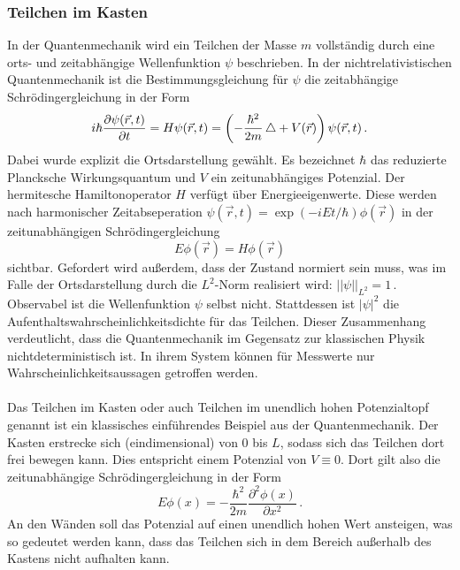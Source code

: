 \subsubsection{Teilchen im Kasten}
\label{subsubsec:kasten}
In der Quantenmechanik wird ein Teilchen der Masse $m$ vollständig durch eine orts- und zeitabhängige Wellenfunktion $\psi$ beschrieben. In der nichtrelativistischen Quantenmechanik ist die Bestimmungsgleichung für $\psi$ die zeitabhängige Schrödingergleichung in der Form
\begin{equation}
  i \hbar \frac{\partial \psi(\vec{r},t)}{\partial t} = H \psi(\vec{r},t) = \left(- \frac{\hbar^2}{2 m} \mathop{}\!\mathbin\bigtriangleup + V(\vec{r})\right) \psi(\vec{r},t)\,.
  \label{eqn:schroedingerZeitabhaengig}
\end{equation}
Dabei wurde explizit die Ortsdarstellung gewählt. Es bezeichnet $\hbar$ das reduzierte Plancksche Wirkungsquantum und $V$ ein zeitunabhängiges Potenzial. Der hermitesche Hamiltonoperator $H$ verfügt über Energieeigenwerte. Diese werden nach harmonischer Zeitabseperation $\psi(\vec{r},t) = \exp(-i E t / \hbar) \phi(\vec{r})$ in der zeitunabhängigen Schrödingergleichung
\begin{equation}
  E \phi(\vec{r}) = H \phi(\vec{r})
  \label{eqn:schroedingerZeitunabhaengig}
\end{equation}
sichtbar. Gefordert wird außerdem, dass der Zustand normiert sein muss, was im Falle der Ortsdarstellung durch die $L^2$-Norm realisiert wird: $\lvert\lvert \psi \rvert\rvert_{L^2} = 1\,.$ Observabel ist die Wellenfunktion $\psi$ selbst nicht. Stattdessen ist $\lvert \psi \rvert ^2$ die Aufenthaltswahrscheinlichkeitsdichte für das Teilchen. Dieser Zusammenhang verdeutlicht, dass die Quantenmechanik im Gegensatz zur klassischen Physik nichtdeterministisch ist. In ihrem System können für Messwerte nur Wahrscheinlichkeitsaussagen getroffen werden.
\\\\
Das Teilchen im Kasten oder auch Teilchen im unendlich hohen Potenzialtopf genannt ist ein klassisches einführendes Beispiel aus der Quantenmechanik. Der Kasten erstrecke sich (eindimensional) von 0 bis $L$, sodass sich das Teilchen dort frei bewegen kann. Dies entspricht einem Potenzial von $V \equiv 0$. Dort gilt also die zeitunabhängige Schrödingergleichung in der Form
\begin{equation}
  E \phi(x) = - \frac{\hbar^2}{2 m}  \frac{\partial^2 \phi(x)} {\partial x^2} \,.
  \label{eqn:schroedingerKasten}
\end{equation}
An den Wänden soll das Potenzial auf einen unendlich hohen Wert ansteigen, was so gedeutet werden kann, dass das Teilchen sich in dem Bereich außerhalb des Kastens nicht aufhalten kann.\\

